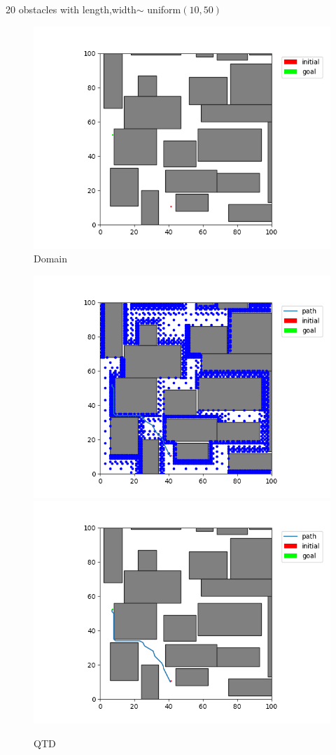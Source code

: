 \documentclass[12pt,a4paper]{article}
\begin{document}
20 obstacles with length,width$\sim$ uniform$(10,50)$\\
\begin{figure}[H]
\centering
	\includegraphics[scale=.40]{20_50_emp}
\caption{Domain}
\end{figure}

\begin{figure}[H]
\centering
	\includegraphics[scale=.40]{20_50_qtd_state}
    \includegraphics[scale=.40]{20_50_qtd_path}
\caption{QTD}
\end{figure}
\end{document}
